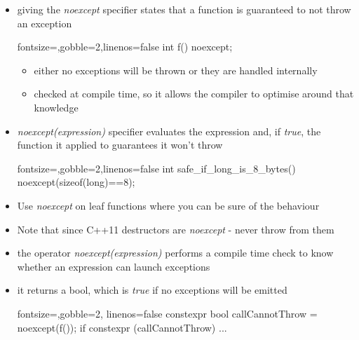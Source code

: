 \begin{frame}[fragile]
  \begin{block}{}
    \begin{itemize}
      \item giving the \textit{noexcept} specifier states that a function is guaranteed to not throw an exception
      \begin{cppcode*}{fontsize=\footnotesize,gobble=2,linenos=false}
        int f() noexcept;
      \end{cppcode*}
      \begin{itemize}
        \item either no exceptions will be thrown or they are handled internally
        \item checked at compile time, so it allows the compiler to optimise around that knowledge
      \end{itemize}
      \item \textit{noexcept(expression)} specifier evaluates the expression and, if \textit{true}, the function it applied to guarantees it won't throw
        \begin{cppcode*}{fontsize=\footnotesize,gobble=2,linenos=false}
          int safe_if_long_is_8_bytes() noexcept(sizeof(long)==8);
        \end{cppcode*}
      \item Use \textit{noexcept} on leaf functions where you can be sure of the behaviour
      \item Note that since C++11 destructors are \textit{noexcept} - never throw from them
    \end{itemize}
  \end{block}
\end{frame}


\begin{frame}[fragile]
  \begin{block}{}
    \begin{itemize}
      \item the operator \textit{noexcept(expression)} performs a compile time check to know whether an expression can launch exceptions
      \item it returns a bool, which is \textit{true} if no exceptions will be emitted
        \begin{cppcode*}{fontsize=\footnotesize,gobble=2, linenos=false}
          constexpr bool callCannotThrow = noexcept(f());
          if constexpr (callCannotThrow) { ... }
        \end{cppcode*}
    \end{itemize}
  \end{block}
\end{frame}
